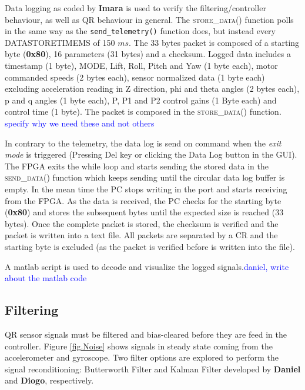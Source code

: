 \documentclass{article}
\newcommand\todo[1]{\textcolor{blue}{#1}} %
\begin{document}
Data logging as coded by \textbf{Imara} is used to verify the filtering/controller behaviour, as well as QR behaviour in general. The \textsc{store\_data()} function polls in the same way as the \texttt{send\_telemetry()} function does, but instead every \textsc{DATASTORETIMEMS} of 150 $ms$. The 33 bytes packet is composed of a starting byte (\textbf{0x80}), 16 parameters (31 bytes) and a checksum. Logged data includes a timestamp (1 byte), MODE, Lift, Roll, Pitch and Yaw (1 byte each), motor commanded speeds (2 bytes each), sensor normalized data (1 byte each) excluding acceleration reading in Z direction, phi and theta angles (2 bytes each), p and q angles (1 byte each), P, P1 and P2 control gains (1 Byte each) and control time (1 byte). The packet is composed in the \textsc{store\_data()} function. \todo{specify why we need these and not others}

In contrary to the telemetry, the data log is send on command when the \emph{exit mode} is triggered (Pressing Del key or clicking the Data Log button in the GUI). The FPGA exits the while loop and starts sending the stored data in the \textsc{send\_data()} function which keeps sending until the circular data log buffer is empty. In the mean time the PC stops writing in the port and starts receiving from the FPGA. As the data is received, the PC checks for the starting byte (\textbf{0x80}) and stores the subsequent bytes until the expected size is reached (33 bytes). Once the complete packet is stored, the checksum is verified and the packet is written into a text file. All packets are separated by a CR and the starting byte is excluded (as the packet is verified before is written into the file).

A matlab script is used to decode and visualize the logged signals.\todo{daniel, write about the matlab code}


\subsection{Filtering}
\label{sec:filtering}

QR sensor signals must be filtered and bias-cleared before they are feed in the controller. Figure \ref{fig.Noise} shows signals in steady state coming from the accelerometer and gyroscope. Two filter options are explored to perform the signal reconditioning: Butterworth Filter and Kalman Filter developed by \textbf{Daniel} and \textbf{Diogo}, respectively.
\end{document}
